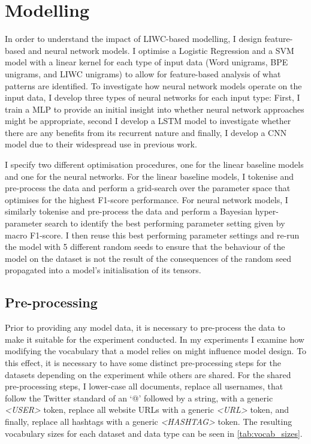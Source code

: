 \section{Modelling}\label{sec:liwc_modelling}

In order to understand the impact of LIWC-based modelling, I design feature-based and neural network models. I optimise a Logistic Regression and a SVM model with a linear kernel for each type of input data (Word unigrams, BPE unigrams, and LIWC unigrams) to allow for feature-based analysis of what patterns are identified. To investigate how neural network models operate on the input data, I develop three types of neural networks for each input type: First, I train a MLP to provide an initial insight into whether neural network approaches might be appropriate, second I develop a LSTM model to investigate whether there are any benefits from its recurrent nature and finally, I develop a CNN model due to their widespread use in previous work.

I specify two different optimisation procedures, one for the linear baseline models and one for the neural networks.
For the linear baseline models, I tokenise and pre-process the data and perform a grid-search over the parameter space that optimises for the highest F1-score performance.
For neural network models, I similarly tokenise and pre-process the data and perform a Bayesian hyper-parameter search to identify the best performing parameter setting given by macro F1-score. I then reuse this best performing parameter settings and re-run the model with 5 different random seeds to ensure that the behaviour of the model on the dataset is not the result of the consequences of the random seed propagated into a model's initialisation of its tensors.

\subsection{Pre-processing}

Prior to providing any model data, it is necessary to pre-process the data to make it suitable for the experiment conducted. In my experiments I examine how modifying the vocabulary that a model relies on might influence model design. To this effect, it is necessary to have some distinct pre-processing steps for the datasets depending on the experiment while others are shared. For the shared pre-processing steps, I lower-case all documents, replace all usernames, that follow the Twitter standard of an `@' followed by a string, with a generic \textit{<USER>} token, replace all website URLs with a generic \textit{<URL>} token, and finally, replace all hashtags with a generic \textit{<HASHTAG>} token. The resulting vocabulary sizes for each dataset and data type can be seen in \cref{tab:vocab_sizes}.

